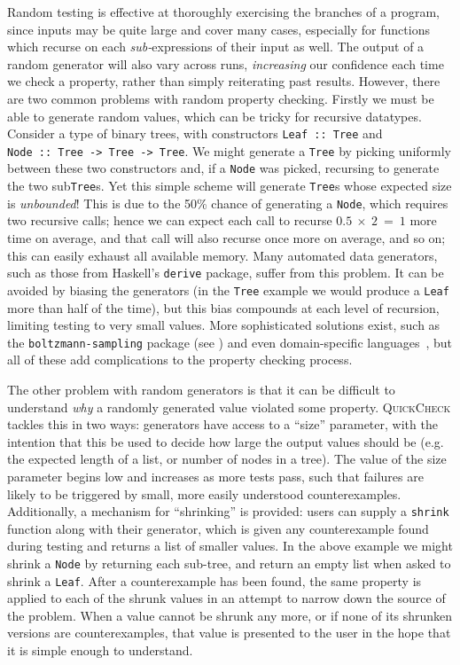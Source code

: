 Random testing is effective at thoroughly exercising the branches of a program,
since inputs may be quite large and cover many cases, especially for functions
which recurse on each \emph{sub-}expressions of their input as well. The output
of a random generator will also vary across runs, \emph{increasing} our
confidence each time we check a property, rather than simply reiterating past
results. However, there are two common problems with random property checking.
Firstly we must be able to generate random values, which can be tricky for
recursive datatypes. Consider a type of binary trees, with constructors
\texttt{Leaf~::~Tree} and \texttt{Node~::~Tree~->~Tree~->~Tree}. We might
generate a \texttt{Tree} by picking uniformly between these two constructors
and, if a \texttt{Node} was picked, recursing to generate the two
sub\texttt{Tree}s. Yet this simple scheme will generate \texttt{Tree}s whose
expected size is \emph{unbounded}! This is due to the 50\% chance of generating
a \texttt{Node}, which requires two recursive calls; hence we can expect each
call to recurse $0.5~\times~2~=~1$ more time on average, and that call will also
recurse once more on average, and so on; this can easily exhaust all available
memory. Many automated data generators, such as those from Haskell's
\texttt{derive} package, suffer from this problem. It can be avoided by biasing
the generators (in the \texttt{Tree} example we would produce a \texttt{Leaf}
more than half of the time), but this bias compounds at each level of recursion,
limiting testing to very small values. More sophisticated solutions exist, such
as the \texttt{boltzmann-sampling} package (see \cite{duchon2004boltzmann}) and
even domain-specific languages~\cite{lampropoulos2017beginner}, but all of these
add complications to the property checking process.

The other problem with random generators is that it can be difficult to
understand \emph{why} a randomly generated value violated some property.
\textsc{QuickCheck} tackles this in two ways: generators have access to a
``size'' parameter, with the intention that this be used to decide how large the
output values should be (e.g. the expected length of a list, or number of nodes
in a tree). The value of the size parameter begins low and increases as more
tests pass, such that failures are likely to be triggered by small, more easily
understood counterexamples. Additionally, a mechanism for ``shrinking'' is
provided: users can supply a \texttt{shrink} function along with their
generator, which is given any counterexample found during testing and returns a
list of smaller values. In the above example we might shrink a \texttt{Node} by
returning each sub-tree, and return an empty list when asked to shrink a
\texttt{Leaf}. After a counterexample has been found, the same property is
applied to each of the shrunk values in an attempt to narrow down the source of
the problem. When a value cannot be shrunk any more, or if none of its shrunken
versions are counterexamples, that value is presented to the user in the hope
that it is simple enough to understand.


